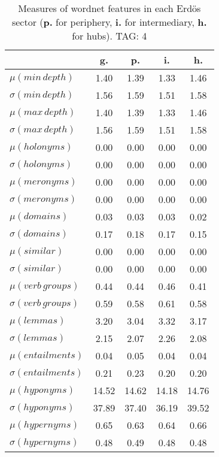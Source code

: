 \begin{table}[h!]
\begin{center}
\begin{tabular}{| l | c | c | c | c |}\hline
 & g. & p. & i. & h. \\\hline
$\mu(min\,depth)$ & 1.40  & 1.39  & 1.33  & 1.46 \\\hline
$\sigma(min\,depth)$ & 1.56  & 1.59  & 1.51  & 1.58 \\\hline
$\mu(max\,depth)$ & 1.40  & 1.39  & 1.33  & 1.46 \\\hline
$\sigma(max\,depth)$ & 1.56  & 1.59  & 1.51  & 1.58 \\\hline
$\mu(holonyms)$ & 0.00  & 0.00  & 0.00  & 0.00 \\\hline
$\sigma(holonyms)$ & 0.00  & 0.00  & 0.00  & 0.00 \\\hline
$\mu(meronyms)$ & 0.00  & 0.00  & 0.00  & 0.00 \\\hline
$\sigma(meronyms)$ & 0.00  & 0.00  & 0.00  & 0.00 \\\hline
$\mu(domains)$ & 0.03  & 0.03  & 0.03  & 0.02 \\\hline
$\sigma(domains)$ & 0.17  & 0.18  & 0.17  & 0.15 \\\hline
$\mu(similar)$ & 0.00  & 0.00  & 0.00  & 0.00 \\\hline
$\sigma(similar)$ & 0.00  & 0.00  & 0.00  & 0.00 \\\hline
$\mu(verb\,groups)$ & 0.44  & 0.44  & 0.46  & 0.41 \\\hline
$\sigma(verb\,groups)$ & 0.59  & 0.58  & 0.61  & 0.58 \\\hline
$\mu(lemmas)$ & 3.20  & 3.04  & 3.32  & 3.17 \\\hline
$\sigma(lemmas)$ & 2.15  & 2.07  & 2.26  & 2.08 \\\hline
$\mu(entailments)$ & 0.04  & 0.05  & 0.04  & 0.04 \\\hline
$\sigma(entailments)$ & 0.21  & 0.23  & 0.20  & 0.20 \\\hline
$\mu(hyponyms)$ & 14.52  & 14.62  & 14.18  & 14.76 \\\hline
$\sigma(hyponyms)$ & 37.89  & 37.40  & 36.19  & 39.52 \\\hline
$\mu(hypernyms)$ & 0.65  & 0.63  & 0.64  & 0.66 \\\hline
$\sigma(hypernyms)$ & 0.48  & 0.49  & 0.48  & 0.48 \\\hline
\end{tabular}
\caption{Measures of wordnet features in each Erd\"os sector ({{\bf p.}} for periphery, {{\bf i.}} for intermediary, {{\bf h.}} for hubs). TAG: 4}
\end{center}
\end{table}